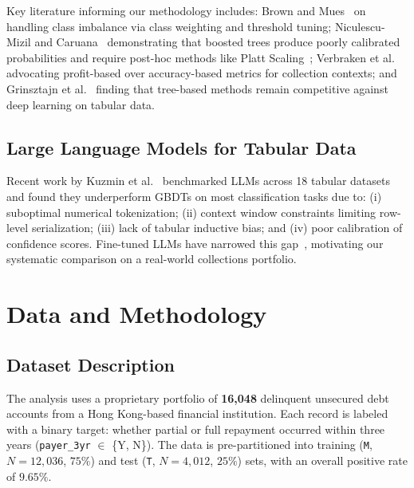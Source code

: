 \documentclass[12pt, a4paper]{article}
\begin{document}
Key literature informing our methodology includes: Brown and Mues~\cite{brown2012} on handling class imbalance via class weighting and threshold tuning; Niculescu-Mizil and Caruana~\cite{niculescu2005} demonstrating that boosted trees produce poorly calibrated probabilities and require post-hoc methods like Platt Scaling~\cite{platt1999}; Verbraken et al.~\cite{verbraken2014} advocating profit-based over accuracy-based metrics for collection contexts; and Grinsztajn et al.~\cite{grinsztajn2022} finding that tree-based methods remain competitive against deep learning on tabular data.

\subsection{Large Language Models for Tabular Data}

Recent work by Kuzmin et al.~\cite{kuzmin2024tabllm} benchmarked LLMs across 18 tabular datasets and found they underperform GBDTs on most classification tasks due to: (i) suboptimal numerical tokenization; (ii) context window constraints limiting row-level serialization; (iii) lack of tabular inductive bias; and (iv) poor calibration of confidence scores. Fine-tuned LLMs have narrowed this gap~\cite{Grinsztajn2024LLM}, motivating our systematic comparison on a real-world collections portfolio.


\section{Data and Methodology}\label{sec:methodology}

\subsection{Dataset Description}

The analysis uses a proprietary portfolio of \textbf{16,048} delinquent unsecured debt accounts from a Hong Kong-based financial institution. Each record is labeled with a binary target: whether partial or full repayment occurred within three years (\texttt{payer\_3yr} $\in$ \{Y, N\}). The data is pre-partitioned into training (\texttt{M}, $N = 12{,}036$, $75\%$) and test (\texttt{T}, $N = 4{,}012$, $25\%$) sets, with an overall positive rate of $9.65\%$.
\end{document}
